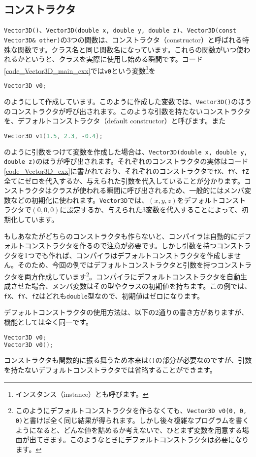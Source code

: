 \subsection{コンストラクタ}
\texttt{Vector3D()}、\texttt{Vector3D(double x, double y, double z)}、\texttt{Vector3D(const Vector3D\& other)}の3つの関数は、コンストラクタ（constructor）と呼ばれる特殊な関数です。クラス名と同じ関数名になっています。これらの関数がいつ使われるかというと、クラスを実際に使用し始める瞬間です。コード\ref{code_Vector3D_main_cxx}では\texttt{v0}という変数\footnote{インスタンス（instance）とも呼びます。}を
\begin{lstlisting}[language=c++]
  Vector3D v0;
\end{lstlisting}
のようにして作成しています。このように作成した変数では、\texttt{Vector3D()}のほうのコンストラクタが呼び出されます。このような引数を持たないコンストラクタを、デフォルトコンストラクタ（default constructor）と呼びます。また
\begin{lstlisting}[language=c++]
  Vector3D v1(1.5, 2.3, -0.4);
\end{lstlisting}
のように引数をつけて変数を作成した場合は、\texttt{Vector3D(double x, double y, double z)}のほうが呼び出されます。それぞれのコンストラクタの実体はコード\ref{code_Vector3D_cxx}に書かれており、それぞれのコンストラクタで\texttt{fX}、\texttt{fY}、\texttt{fZ}全てにゼロを代入するか、与えられた引数を代入していることが分かります。コンストラクタはクラスが使われる瞬間に呼び出されるため、一般的にはメンバ変数などの初期化に使われます。\texttt{Vector3D}では、$(x, y, z)$をデフォルトコンストラクタで$(0, 0, 0)$に設定するか、与えられた3変数を代入することによって、初期化しています。

もしあなたがどちらのコンストラクタも作らないと、コンパイラは自動的にデフォルトコンストラクタを作るので注意が必要です。しかし引数を持つコンストラクタを1つでも作れば、コンパイラはデフォルトコンストラクタを作成しません。そのため、今回の例ではデフォルトコンストラクタと引数を持つコンストラクタを両方作成しています\footnote{このようにデフォルトコンストラクタを作らなくても、\texttt{Vector3D v0(0, 0, 0)}と書けば全く同じ結果が得られます。しかし後々複雑なプログラムを書くようになると、どんな値を詰めるか考えないで、ひとまず変数を用意する場面が出てきます。このようなときにデフォルトコンストラクタは必要になります。}。コンパイラにデフォルトコンストラクタを自動生成させた場合、メンバ変数はその型やクラスの初期値を持ちます。この例では、\texttt{fX}、\texttt{fY}、\texttt{fZ}はどれも\texttt{double}型なので、初期値はゼロになります。

デフォルトコンストラクタの使用方法は、以下の2通りの書き方がありますが、機能としては全く同一です。
\begin{lstlisting}[language=c++]
Vector3D v0;
Vector3D v0();
\end{lstlisting}
コンストラクタも関数的に振る舞うため本来は\texttt{()}の部分が必要なのですが、引数を持たないデフォルトコンストラクタでは省略することができます。

